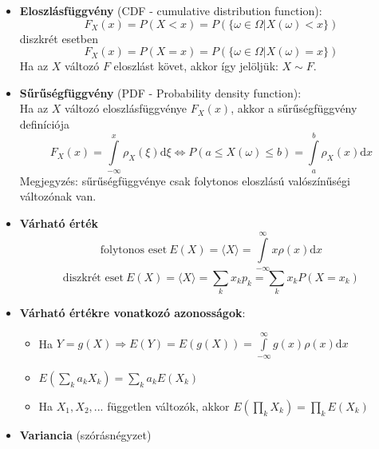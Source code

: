 \documentclass[12pt]{article}
\theoremstyle{plain}
\newcommand{\dd}{\textrm{d}}
\begin{document}
\begin{itemize}
\begin{itemize}
        \end{itemize}
    \item \textbf{Eloszlásfüggvény} (CDF - cumulative distribution function):
        \begin{equation*}
            F_X(x) = P(X<x) = P(\{\omega\in\Omega | X(\omega)<x \})
        \end{equation*}
        diszkrét esetben 
        \begin{equation*}
            F_X(x) = P(X=x) = P(\{\omega\in\Omega | X(\omega)=x \})
        \end{equation*}
        Ha az $X$ változó $F$ eloszlást követ, akkor így jelöljük: $X\sim F$.
    \item \textbf{Sűrűségfüggvény} (PDF - Probability density function):\\
    Ha az $X$ változó eloszlásfüggvénye $F_X(x)$, akkor a sűrűségfüggvény definíciója
        \begin{equation*}
            F_X(x) = \int\limits_{-\infty}^{x}\rho_X(\xi)\dd \xi \Longleftrightarrow P(a \leq X(\omega) \leq b) = \int\limits_{a}^{b}\rho_X(x)\dd x
        \end{equation*}
        Megjegyzés: sűrűségfüggvénye csak folytonos eloszlású valószínűségi változónak van.
    \item \textbf{Várható érték}
    \begin{equation*}
        \text{folytonos eset}~E(X) = \langle X \rangle = \int\limits_{-\infty}^{\infty}x\rho(x) \dd x 
    \end{equation*}
    \begin{equation*}
        \text{diszkrét eset}~E(X) = \langle X \rangle = \sum\limits_{k} x_k p_k = \sum\limits_{k} x_k P(X=x_k)
    \end{equation*}
    \item \textbf{Várható értékre vonatkozó azonosságok}:
        \begin{itemize}
            \item Ha $Y=g(X) \Rightarrow E(Y) = E(g(X)) = {\displaystyle\int\limits_{-\infty}^{\infty}g(x)\rho(x) \dd x}$  
            \item ${\displaystyle E\left(\sum\limits_k a_k X_k\right) = \sum\limits_k a_k E(X_k)}$
            \item Ha $X_1, X_2, ...$ független változók, akkor ${\displaystyle E\left(\prod\limits_k X_k\right) = \prod\limits_k E(X_k)}$
        \end{itemize}
    \item \textbf{Variancia} (szórásnégyzet)\\

\end{itemize}
\end{document}
